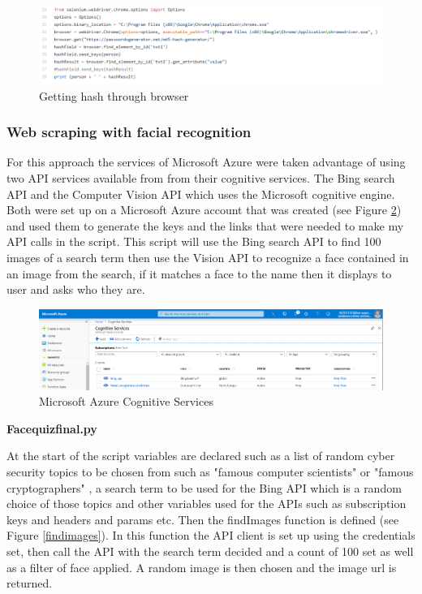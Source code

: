\documentclass[12pt,a4paper]{article}
\begin{document}
\begin{figure}[!ht]
    \centering
    \includegraphics[width=1.0\textwidth]{Figs/web_scrape2.PNG} 
    \caption{Getting hash through browser} 
    \label{Webscrape2}
\end{figure} 



\subsubsection{Web scraping with facial recognition}   

For this approach the services of Microsoft Azure were taken advantage of using two API services available from from their cognitive services. The Bing search API and the Computer Vision API which uses the Microsoft cognitive engine. Both were set up on a Microsoft Azure account that was created (see Figure \ref{Azure}) and used them to generate the keys and the links that were needed to make my API calls in the script. This script will use the Bing search API to find 100 images of a search term then use the Vision API to recognize a face contained in an image from the search, if it matches a face to the name then it displays to user and asks who they are. 

\begin{figure}[!ht]
    \centering
    \includegraphics[width=1.0\textwidth]{Figs/Azure.PNG} 
    \caption{Microsoft Azure Cognitive Services} 
    \label{Azure}
\end{figure}

\textbf{Face\textunderscore quiz\textunderscore final.py} 

At the start of the script variables are declared such as a list of random cyber security topics to be chosen from such as "famous computer scientists" or "famous cryptographers" , a search term to be used for the Bing API which is a random choice of those topics and other variables used for the APIs such as subscription keys and headers and params etc. Then the findImages function is defined (see Figure \ref{findimages}). In this function the API client is set up using the credentials set, then call the API with the search term decided and a count of 100 set as well as a filter of face applied. A random image is then chosen and  the image url is returned. 
\end{document}
